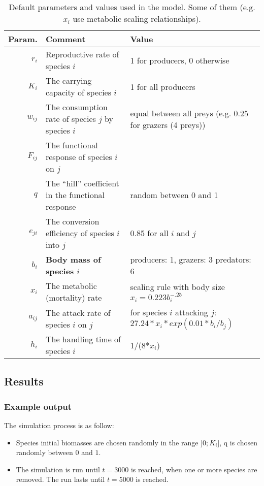 \documentclass[a4paper,11pt]{article}
\begin{document}
    \begin{sidewaystable}[s]
      \begin{tabular}{r | l | l}
        Param.    & Comment                                               & Value  \\
        \hline 
        $r_i$     & Reproductive rate of species $i$                      & 1 for producers, 0 otherwise \\
        $K_i$     & The carrying capacity of species $i$                  & 1 for all producers \\
        $w_{ij}$  & The consumption rate of species $j$ by species $i$    & equal between all preys (e.g. 0.25 for grazers (4 preys)) \\
        $F_{ij}$  & The functional response of species $i$ on $j$         & \\
        $q$       & The ``hill'' coefficient in the functional response   & random between 0 and 1 \\
        $e_{ji}$  & The conversion efficiency of species $i$ into $j$     & 0.85 for all $i$ and $j$ \\
        $b_{i}$   & \textbf{Body mass of species $i$}                     & producers: 1, grazers: 3 predators: 6 \\
        $x_i$     & The metabolic (mortality) rate                        & scaling rule with body size $x_i = 0.223 b_i^{-.25}$ \\
        $a_{ij}$  & The attack rate of species $i$ on $j$                 & for species $i$ attacking $j$: $27.24 * x_{i} * exp(0.01 * b_{i}/b_{j})$ \\
        $h_i$     & The handling time of species $i$                      & 1/(8*$x_i$) 
      \end{tabular}
      \caption{Default parameters and values used in the model. Some of them (e.g. $x_i$ use metabolic scaling relationships). }
      \label{tab:parameters}
    \end{sidewaystable}
    
    \subsection{Results}
      \subsubsection{Example output}
      
        The simulation process is as follow: 
        \begin{itemize}
          \item Species initial biomasses are chosen randomly in the range 
                $]0;K_i]$, q is chosen randomly between $0$ and $1$.
          \item The simulation is run until $t=3000$ is reached, when one or 
                more species are removed. The run lasts until $t=5000$ is 
                reached. 
        \end{itemize}
        
\end{document}
